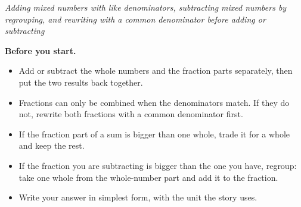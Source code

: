 \documentclass[12pt]{article}
\begin{document}

\begin{center}
\textit{Adding mixed numbers with like denominators, subtracting mixed numbers
by regrouping, and rewriting with a common denominator before adding or
subtracting}
\end{center}

\noindent\textbf{Before you start.}
\begin{itemize}[leftmargin=1.2cm, itemsep=2pt, topsep=2pt]
\item Add or subtract the whole numbers and the fraction parts separately, then
put the two results back together.
\item Fractions can only be combined when the denominators match. If they do
not, rewrite both fractions with a common denominator first.
\item If the fraction part of a sum is bigger than one whole, trade it for a
whole and keep the rest.
\item If the fraction you are subtracting is bigger than the one you have,
regroup: take one whole from the whole-number part and add it to the fraction.
\item Write your answer in simplest form, with the unit the story uses.
\end{itemize}

\vspace{0.2cm}




\end{document}
